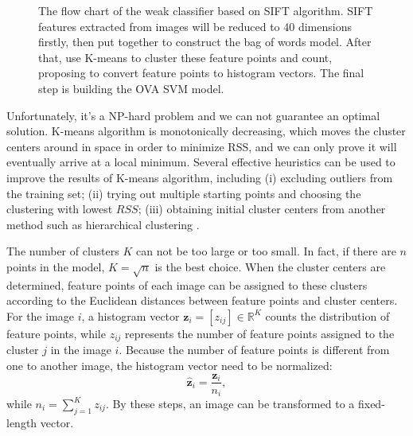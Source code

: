 \documentclass[conference]{IEEEtran}
\begin{document}
\begin{figure}[H]
				\centering
				\caption{ The flow chart of the weak classifier based on SIFT algorithm. SIFT features extracted from images will be reduced to 40 dimensions firstly, then put together to construct the bag of words model. After that, use K-means to cluster these feature points and count, proposing to convert feature points to histogram vectors. The final step is building the OVA SVM model. }\label{sift}
			\end{figure}

Unfortunately, it's a NP-hard problem and we can not guarantee an optimal solution. K-means algorithm is monotonically decreasing, which moves the cluster centers around in space in order to minimize RSS, and we can only prove it will eventually arrive at a local minimum. Several effective heuristics can be used to improve the results of K-means algorithm, including (i)  excluding outliers from the training set; (ii) trying out multiple starting points and choosing the clustering with lowest $RSS$; (iii) obtaining initial cluster centers from another method such as hierarchical clustering \cite{proving}.

The number of clusters $K$ can not be too large or too small. In fact, if there are $n$ points in the model, $K = \sqrt{n}$ is the best choice\cite{knn}. When the cluster centers are determined, feature points of each image can be assigned to these clusters according to the Euclidean distances between feature points and cluster centers. For the image $i$, a histogram vector $\mathbf{z}_i = [z_{ij}] \in \mathbb{R}^{K}$ counts the distribution of feature points, while $z_{ij}$ represents the number of feature points assigned to the cluster $j$ in the image $i$. Because the number of feature points is different from one to another image, the histogram vector need to be normalized:
\begin{equation}
	\hat{\mathbf{z}}_{i} = \frac{\mathbf{z}_{i}}{n_i},
\end{equation}
while $n_i = \sum\limits_{j=1}^{K}z_{ij}$. By these steps, an image can be transformed to a fixed-length vector.
\end{document}
